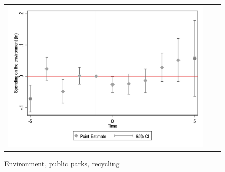\begin{figure}[ht]
\begin{tabular}{@{}ccc@{}}
\begin{minipage}[t]{0.32\textwidth}
            \centering
            \caption{Environment, public parks, recycling}
            \includegraphics[width=\linewidth]{images/pop_10000/caseventdd_ln_q4_09_step1.jpg}
            \label{fig:casenvironment}
        \end{minipage}
    \end{tabular}
\end{figure}
